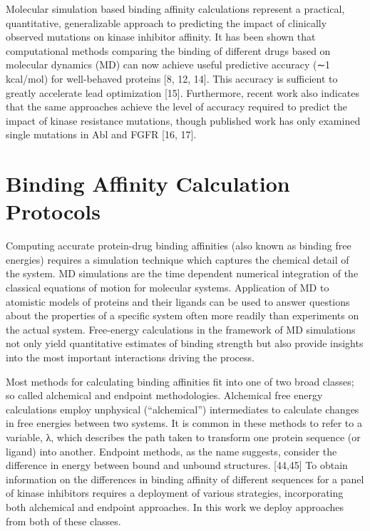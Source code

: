 \documentclass[conference]{IEEEtran}
\begin{document}
Molecular simulation based binding affinity calculations represent a practical, quantitative, generalizable approach to predicting the impact of clinically observed mutations on kinase inhibitor affinity. It has been shown that computational methods comparing the binding of different drugs based on molecular dynamics (MD) can now achieve useful predictive accuracy (∼1 kcal/mol) for well-behaved proteins [8, 12, 14]. This accuracy is sufficient to greatly accelerate lead optimization [15]. Furthermore, recent work also indicates that the same approaches achieve the level of accuracy required to predict the impact of kinase resistance mutations, though published work has only examined single mutations in Abl and FGFR [16, 17].

\section{Binding Affinity Calculation Protocols}\label{sec:bac}

Computing accurate protein-drug binding affinities (also known as binding free energies) requires a simulation technique which captures the chemical detail of the system. MD simulations are the time dependent numerical integration of the classical equations of motion for molecular systems. Application of MD to atomistic models of proteins and their ligands can be used to answer questions about the properties of a specific system often more readily than experiments on the actual system. Free-energy calculations in the framework of MD simulations not only yield quantitative estimates of binding strength but also provide insights into the most important interactions driving the process.

Most methods for calculating binding affinities fit into one of two broad classes; so called alchemical and endpoint methodologies. Alchemical free energy calculations employ unphysical (“alchemical”) intermediates to calculate changes in free energies between two systems. It is common in these methods to refer to a variable, λ, which describes the path taken to transform one protein sequence (or ligand) into another. Endpoint methods, as the name suggests, consider the difference in energy between bound and unbound structures. [44,45] To obtain information on the differences in binding affinity of different sequences for a panel of kinase inhibitors requires a deployment of various strategies, incorporating both alchemical and endpoint approaches. In this work we deploy approaches from both of these classes.
\end{document}
